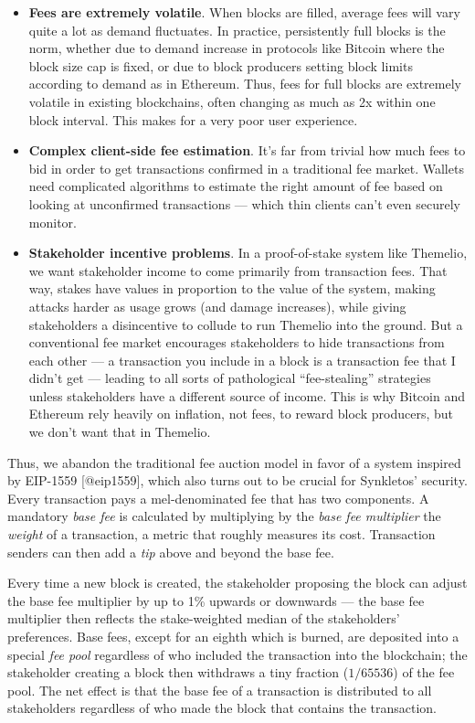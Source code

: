 \documentclass[]{article}
\providecommand{\tightlist}{%
  \setlength{\itemsep}{0pt}\setlength{\parskip}{0pt}}
\begin{document}
\begin{itemize}
\tightlist
\item
  \textbf{Fees are extremely volatile}. When blocks are filled, average
  fees will vary quite a lot as demand fluctuates. In practice,
  persistently full blocks is the norm, whether due to demand increase
  in protocols like Bitcoin where the block size cap is fixed, or due to
  block producers setting block limits according to demand as in
  Ethereum. Thus, fees for full blocks are extremely volatile in
  existing blockchains, often changing as much as 2x within one block
  interval. This makes for a very poor user experience.
\item
  \textbf{Complex client-side fee estimation}. It's far from trivial how
  much fees to bid in order to get transactions confirmed in a
  traditional fee market. Wallets need complicated algorithms to
  estimate the right amount of fee based on looking at unconfirmed
  transactions --- which thin clients can't even securely monitor.
\item
  \textbf{Stakeholder incentive problems}. In a proof-of-stake system
  like Themelio, we want stakeholder income to come primarily from
  transaction fees. That way, stakes have values in proportion to the
  value of the system, making attacks harder as usage grows (and damage
  increases), while giving stakeholders a disincentive to collude to run
  Themelio into the ground. But a conventional fee market encourages
  stakeholders to hide transactions from each other --- a transaction
  you include in a block is a transaction fee that I didn't get ---
  leading to all sorts of pathological ``fee-stealing'' strategies
  unless stakeholders have a different source of income. This is why
  Bitcoin and Ethereum rely heavily on inflation, not fees, to reward
  block producers, but we don't want that in Themelio.
\end{itemize}

Thus, we abandon the traditional fee auction model in favor of a system
inspired by EIP-1559 {[}@eip1559{]}, which also turns out to be crucial
for Synkletos' security. Every transaction pays a mel-denominated fee
that has two components. A mandatory \emph{base fee} is calculated by
multiplying by the \emph{base fee multiplier} the \emph{weight} of a
transaction, a metric that roughly measures its cost. Transaction
senders can then add a \emph{tip} above and beyond the base fee.

Every time a new block is created, the stakeholder proposing the block
can adjust the base fee multiplier by up to 1\% upwards or downwards ---
the base fee multiplier then reflects the stake-weighted median of the
stakeholders' preferences. Base fees, except for an eighth which is
burned, are deposited into a special \emph{fee pool} regardless of who
included the transaction into the blockchain; the stakeholder creating a
block then withdraws a tiny fraction (\(1/65536\)) of the fee pool. The
net effect is that the base fee of a transaction is distributed to all
stakeholders regardless of who made the block that contains the
transaction.
\end{document}
